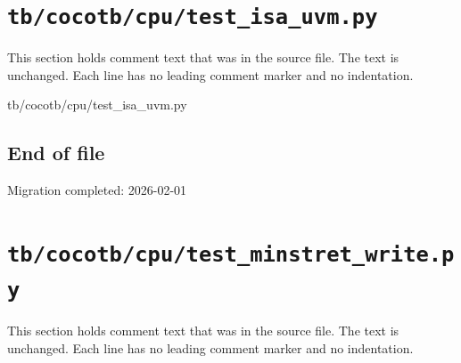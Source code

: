 \section{\texttt{tb/cocotb/cpu/test\_isa\_uvm.py}}\label{tm:suite:cpu-test-isa-uvm}

This section holds comment text that was in the source file. The text is unchanged. Each line has no leading comment marker and no indentation.

\begin{relocated}{tb/cocotb/cpu/test_isa_uvm.py}

\subsection*{End of file}

\begin{textblock}
Migration completed: 2026-02-01
\end{textblock}

\end{relocated}

\section{\texttt{tb/cocotb/cpu/test\_minstret\_write.py}}\label{tm:suite:cpu-test-minstret-write}

This section holds comment text that was in the source file. The text is unchanged. Each line has no leading comment marker and no indentation.

